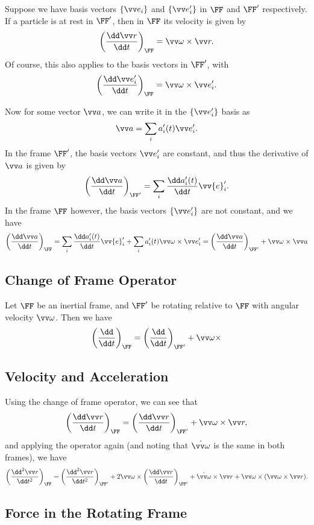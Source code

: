 Suppose we have basis vectors $\{\vv e_i\}$ and $\{\vv e_i'\}$ in $\FF$ and $\FF'$ respectively. If a particle is at rest in $\FF'$, then in $\FF$ its velocity is given by
	$$
	\left(\frac{\dd \vv r}{\dd t}\right)_{\FF} = \vv \omega \times \vv r.
	$$
	Of course, this also applies to the basis vectors in $\FF'$, with
	$$
	\left(\frac{\dd \vv e_i'}{\dd t}\right)_{\FF} =\vv \omega \times \vv e_i'.
	$$

	Now for some vector $\vv a$, we can write it in the $\{\vv e_i'\}$ basis as
	$$
\vv a = \sum_i a_i'(t) \vv e_i'.
$$
In the frame $\FF'$, the basis vectors $\vv e_i'$ are constant, and thus the derivative of $\vv a$ is given by
$$
\left(\frac{\dd \vv a}{\dd t}\right)_{\FF'} = \sum_i \frac{\dd a_i'(t)}{\dd t} \vv{e}_i'.
$$
In the frame $\FF$ however, the basis vectors $\{\vv e_i'\}$ are not constant, and we have
$$
\left(\frac{\dd \vv a}{\dd t}\right)_{\FF} = \sum_i \frac{\dd a_i'(t)}{\dd t} \vv{e}_i' + \sum_i a_i'(t) \vv \omega \times \vv e_i' = \left(\frac{\dd \vv a}{\dd t}\right)_{\FF'} +\vv \omega \times \vv a
$$

\subsection{Change of Frame Operator}

Let $\FF$ be an inertial frame, and $\FF'$ be rotating relative to $\FF$ with angular velocity $\vv \omega$.
Then we have
$$
\left(\frac{\dd}{\dd t}\right)_{\FF} = \left(\frac{\dd}{\dd t}\right)_{\FF'} +\vv \omega \times 
$$

\subsection{Velocity and Acceleration}

Using the change of frame operator, we can see that
$$
\left(\frac{\dd \vv r}{\dd t}\right)_{\FF} = \left(\frac{\dd \vv r}{\dd t}\right)_{\FF'} +\vv \omega \times \vv r,
$$
and applying the operator again (and noting that $\dot{\vv \omega}$ is the same in both frames), we have
$$
\left(\frac{\dd^2 \vv r}{\dd t^2}\right)_{\FF} = \left(\frac{\dd^2 \vv r}{\dd t^2}\right)_{\FF'} + 2 \vv \omega \times \left(\frac{\dd \vv r}{\dd t}\right)_{\FF'} + \dot{\vv \omega} \times \vv r + \vv \omega \times (\vv \omega \times \vv r).
$$

\subsection{Force in the Rotating Frame}


